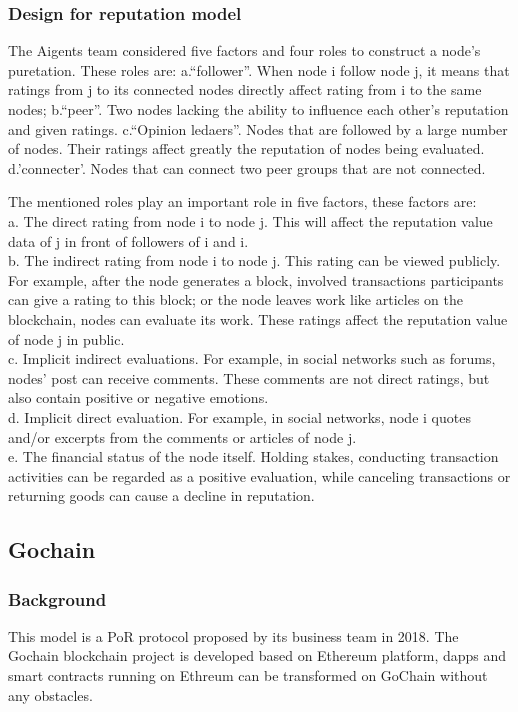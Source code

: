 \documentclass[doublespacing]{bmcart}
\begin{document}
\begin{CJK*}{UTF8}{gbsn}
	\subsubsection*{Design for reputation model}
	The Aigents team considered five factors and four roles to construct a node's puretation. These roles are: a.``follower''. When node i follow node j, it means that ratings from j to its connected nodes directly affect rating from i to the same nodes; b.``peer''. Two nodes lacking the ability to influence each other's reputation and given ratings. c.``Opinion ledaers''. Nodes that are followed by a large number of nodes. Their ratings affect greatly the reputation of nodes being evaluated. d.'connecter'. Nodes that can connect two peer groups that are not connected.
	
	The mentioned roles play an important role in five factors, these factors are:
	\\a. The direct rating from node i to node j. This will affect the reputation value data of j in front of followers of i and i.
	\\b. The indirect rating from node i to node j. This rating can be viewed publicly. For example, after the node generates a block, involved transactions participants can give a rating to this block; or the node leaves work like articles on the blockchain, nodes can evaluate its work. These ratings affect the reputation value of node j in public.
	\\c. Implicit indirect evaluations. For example, in social networks such as forums, nodes' post can receive comments. These comments are not direct ratings, but also contain positive or negative emotions.
	\\d. Implicit direct evaluation. For example, in social networks, node i quotes and/or excerpts from the comments or articles of node j.
	\\e. The financial status of the node itself. Holding stakes, conducting transaction activities can be regarded as a positive evaluation, while canceling transactions or returning goods can cause a decline in reputation.
	
\subsection{Gochain} 
\subsubsection*{Background} 
	This model is a PoR protocol proposed by its business team in 2018. The Gochain blockchain project is developed based on Ethereum platform, dapps and smart contracts running on Ethreum can be transformed on GoChain without any obstacles.
	 

\end{CJK*}
\end{document}
